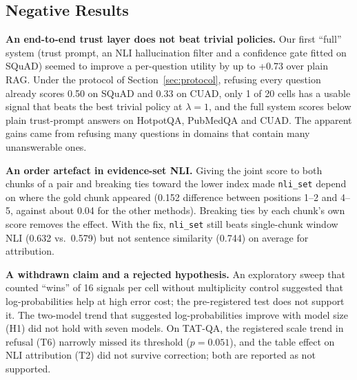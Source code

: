 \documentclass[conference]{IEEEtran}
\newcommand{\m}[1]{\texttt{#1}}   %
\begin{document}
\subsection{Negative Results}
\label{sec:neg}
\textbf{An end-to-end trust layer does not beat trivial policies.} Our first ``full'' system (trust prompt, an NLI hallucination filter and a confidence
gate fitted on SQuAD) seemed to improve a per-question utility by up to +0.73 over plain RAG. Under the protocol of Section~\ref{sec:protocol}, refusing
every question already scores 0.50 on SQuAD and 0.33 on CUAD, only 1 of 20 cells has a usable signal that beats the best trivial policy at $\lambda=1$,
and the full system scores below plain trust-prompt answers on HotpotQA, PubMedQA and CUAD. The apparent gains came from refusing many questions in
domains that contain many unanswerable ones.

\textbf{An order artefact in evidence-set NLI.} Giving the joint score to both chunks of a pair and breaking ties toward the lower index made
\m{nli\_set} depend on where the gold chunk appeared (0.152 difference between positions 1--2 and 4--5, against about 0.04 for the other methods).
Breaking ties by each chunk's own score removes the effect. With the fix, \m{nli\_set} still beats single-chunk window NLI (0.632 vs.\ 0.579) but not
sentence similarity (0.744) on average for attribution.

\textbf{A withdrawn claim and a rejected hypothesis.} An exploratory sweep that counted ``wins'' of 16 signals per cell without multiplicity control
suggested that log-probabilities help at high error cost; the pre-registered test does not support it. The two-model trend that suggested
log-probabilities improve with model size (H1) did not hold with seven models. On TAT-QA, the registered scale trend in refusal (T6) narrowly missed
its threshold ($p=0.051$), and the table effect on NLI attribution (T2) did not survive correction; both are reported as not supported.

\end{document}
